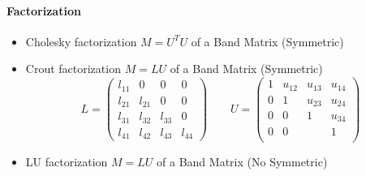 \paragraph{Factorization}
\begin{itemize}
\item 
  \sshortdescribe Cholesky factorization $ M= U^T U$ of
  a Band Matrix (Symmetric)
\item  {}
  \sshortdescribe Crout factorization $
  M= L U$ of a Band Matrix (Symmetric)
  \begin{equation*}
    \label{eq:2}
    L=\begin{pmatrix}
      l_{11}&0&0&0\\ l_{21}&l_{21}&0&0\\
      l_{31}&l_{32}&l_{33}&0\\ l_{41}&l_{42}&l_{43}&l_{44}
    \end{pmatrix} \quad \quad
    U=\begin{pmatrix} 1&u_{12}&u_{13}&u_{14}\\
      0&1&u_{23}&u_{24}\\ 0&0&1&u_{34}\\ 0&0&&1\\
    \end{pmatrix}    
  \end{equation*}
\item  {}
  \sshortdescribe LU factorization $ M= L U$ of a Band
  Matrix (No Symmetric)
\end{itemize}

